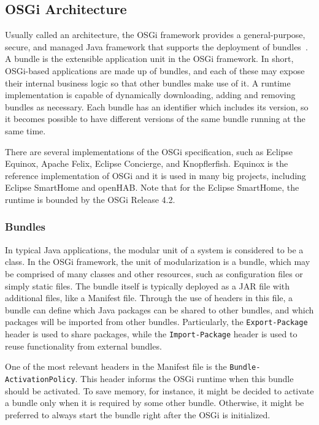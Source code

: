 \documentclass[12pt]{article}
\begin{document}
\subsection{OSGi Architecture}

Usually called an architecture, the OSGi framework provides a general-purpose, secure, and managed Java framework that supports the deployment of bundles~\cite{osgi_core}. A bundle is the extensible application unit in the OSGi framework. In short, OSGi-based applications are made up of bundles, and each of these may expose their internal business logic so that other bundles make use of it. A runtime implementation is capable of dynamically downloading, adding and removing bundles as necessary. Each bundle has an identifier which includes its version, so it becomes possible to have different versions of the same bundle running at the same time. 

There are several implementations of the OSGi specification, such as Eclipse Equinox, Apache Felix, Eclipse Concierge, and Knopflerfish. Equinox is the reference implementation of OSGi and it is used in many big projects, including Eclipse SmartHome and openHAB. Note that for the Eclipse SmartHome, the runtime is bounded by the OSGi Release 4.2. 

\subsubsection{Bundles}

In typical Java applications, the modular unit of a system is considered to be a class. In the OSGi framework, the unit of modularization is a bundle, which may be comprised of many classes and other resources, such as configuration files or simply static files. The bundle itself is typically deployed as a JAR file with additional files, like a Manifest file. Through the use of headers in this file, a bundle can define which Java packages can be shared to other bundles, and which packages will be imported from other bundles. Particularly, the \texttt{Export-Package} header is used to share packages, while the \texttt{Import-Package} header is used to reuse functionality from external bundles.

One of the most relevant headers in the Manifest file is the \texttt{Bundle-ActivationPolicy}. This header informs the OSGi runtime when this bundle should be activated. To save memory, for instance, it might be decided to activate a bundle only when it is required by some other bundle. Otherwise, it might be preferred to always start the bundle right after the OSGi is initialized. 
\end{document}
